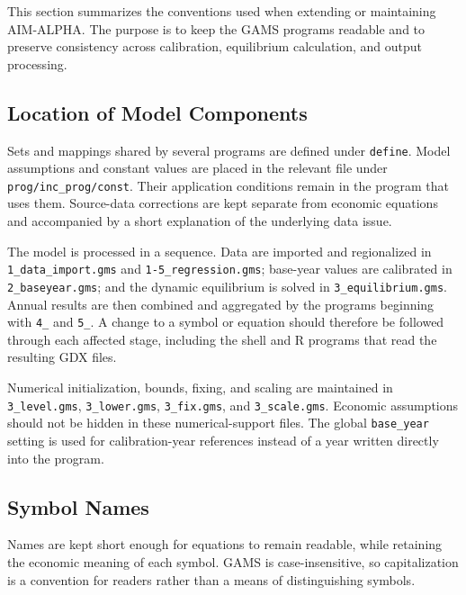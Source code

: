 
This section summarizes the conventions used when extending or maintaining AIM-ALPHA. The purpose is to keep the GAMS programs readable and to preserve consistency across calibration, equilibrium calculation, and output processing.

\subsection{Location of Model Components}

Sets and mappings shared by several programs are defined under \texttt{define}. Model assumptions and constant values are placed in the relevant file under \texttt{prog/inc\_prog/const}. Their application conditions remain in the program that uses them. Source-data corrections are kept separate from economic equations and accompanied by a short explanation of the underlying data issue.

The model is processed in a sequence. Data are imported and regionalized in \texttt{1\_data\_import.gms} and \texttt{1-5\_regression.gms}; base-year values are calibrated in \texttt{2\_baseyear.gms}; and the dynamic equilibrium is solved in \texttt{3\_equilibrium.gms}. Annual results are then combined and aggregated by the programs beginning with \texttt{4\_} and \texttt{5\_}. A change to a symbol or equation should therefore be followed through each affected stage, including the shell and R programs that read the resulting GDX files.

Numerical initialization, bounds, fixing, and scaling are maintained in \texttt{3\_level.gms}, \texttt{3\_lower.gms}, \texttt{3\_fix.gms}, and \texttt{3\_scale.gms}. Economic assumptions should not be hidden in these numerical-support files. The global \texttt{base\_year} setting is used for calibration-year references instead of a year written directly into the program.

\subsection{Symbol Names}

Names are kept short enough for equations to remain readable, while retaining the economic meaning of each symbol. GAMS is case-insensitive, so capitalization is a convention for readers rather than a means of distinguishing symbols.

